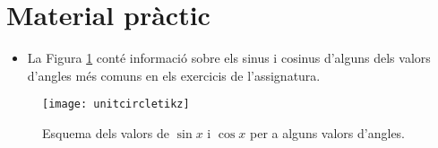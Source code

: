 \section{Material pràctic}

\begin{itemize}
    \item La Figura \ref{Fig:unitcircle} conté informació sobre els sinus i cosinus d'alguns dels valors d'angles més comuns en els exercicis de l'assignatura.
\end{itemize}

\begin{figure}
    \begin{minipage}[r]{0.7\textwidth}
      \texttt{[image: unitcircletikz]}
    \end{minipage}\hfill
    \begin{minipage}[l]{0.3\textwidth}
      \caption{
        Esquema dels valors de $\sin x$ i $\cos x$ per a alguns valors d'angles.
      } \label{Fig:unitcircle}
    \end{minipage}
\end{figure}